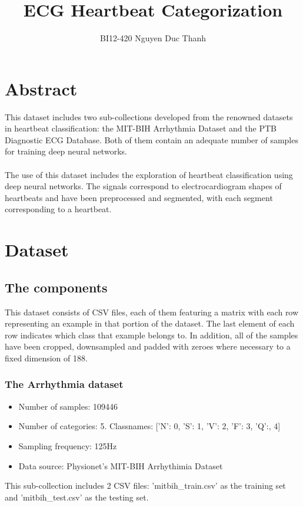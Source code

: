 \documentclass{report}
\title{ECG Heartbeat Categorization}
\author{BI12-420 Nguyen Duc Thanh}
\begin{document}
\maketitle

\tableofcontents

\chapter{Abstract}
This dataset includes two sub-collections developed from the renowned datasets in heartbeat classification: the MIT-BIH Arrhythmia Dataset and the PTB Diagnostic ECG Database. Both of them contain an adequate number of samples for training deep neural networks.\\
\\
The use of this dataset includes the exploration of heartbeat classification using deep neural networks. The signals correspond to electrocardiogram shapes of heartbeats and have been preprocessed and segmented, with each segment corresponding to a heartbeat.


\chapter{Dataset}
\section{The components}
This dataset consists of CSV files, each of them featuring a matrix with each row representing an example in that portion of the dataset. The last element of each row indicates which class that example belongs to. In addition, all of the samples have been cropped, downsampled and padded with zeroes where necessary to a fixed dimension of 188.
\subsection{The Arrhythmia dataset}
\begin{itemize}
    \item Number of samples: 109446
    \item Number of categories: 5. Classnames: ['N': 0, 'S': 1, 'V': 2, 'F': 3, 'Q':, 4]
    \item Sampling frequency: 125Hz
    \item Data source: Physionet's MIT-BIH Arrhythimia Dataset
\end{itemize}

This sub-collection includes 2 CSV files: 'mitbih\_train.csv' as the training set and 'mitbih\_test.csv' as the testing set.\\
\end{document}
